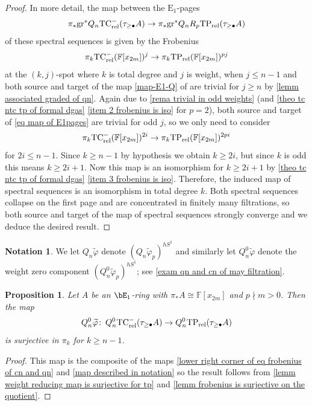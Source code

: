 \documentclass[english,10pt]{amsart}
\newcommand{\rel}{\textup{rel}}
\newcommand{\field}{\mathbb{F}}
\newtheorem{prop}{Proposition}[section]
\theoremstyle{definition}
\newtheorem{nota}{Notation}[section]
\numberwithin{equation}{section}
\newcommand{\rntc}{\mathrm{TC}_{\rel}^{-}}
\newcommand{\rtp}{\mathrm{TP}_{\rel}}
\newcommand{\wtw}{\tau_{\geq \bullet}}
\newcommand{\pis}{\pi_*}
\def\co{\colon\thinspace}
\newcommand{\gr}{\textup{gr}^*}
\begin{document}
\begin{proof}
In more detail, the map between the $\mathrm{E}_1$-pages 
\begin{equation}\label{map-E1-Q} \pi_*\gr Q_n \rntc(\tau_{\geq \bullet }A)\to \pi_*\gr Q_nR_p\rtp(\tau_{\geq \bullet }A)
\end{equation}
of these spectral sequences is given by the Frobenius 
\begin{equation}\label{eq map of E1pages}
\pi_k\rntc(\field[x_{2m}])^{j} \to \pi_k \rtp(\field[x_{2m}])^{pj}
\end{equation}
at the $(k,j)$-spot where $k$ is total degree and $j$ is weight, 
when $j\leq n-1$ and both source and target of the map \eqref{map-E1-Q} of are trivial for $j \geq n$ by \autoref{lemm associated graded of qn}.
Again due to  \autoref{rema trivial in odd weights} (and \autoref{theo tc ntc tp of formal dgas} \eqref{item 2 frobenius is iso} for $p=2$), both source and target of \eqref{eq map of E1pages} are trivial for odd $j$, so we only need to consider 
\[\pi_k\rntc(\field[x_{2m}])^{2i} \to \pi_k \rtp(\field[x_{2m}])^{2pi}\]
for  $2i\leq n-1$.  Since $k\geq n-1$ by hypothesis we obtain $k\geq 2i$, but since $k$ is odd this means $k\geq 2i+1$. Now this map is an isomorphism for $k \geq 2i+1$ by \autoref{theo tc ntc tp of formal dgas} \eqref{item 3 frobenius is iso}. Therefore, the induced map of spectral sequences is an isomorphism in total degree $k$. Both spectral sequences collapse on the first page and are concentrated in finitely many filtrations, so both source and target of the map of spectral sequences strongly converge and we deduce the desired result.

\end{proof}

\begin{nota}
We let $Q_n\widetilde{\varphi}$ denote $(Q_n\widetilde{\varphi}_p)^{hS^1}$ and similarly let  $Q_n^0\widetilde{\varphi}$ denote the weight zero component $(Q_n^0\widetilde{\varphi}_p)^{hS^1}$; see \autoref{exam qn and cn of may filtration}.
\end{nota}
\begin{prop}\label{coro frobenius is surjective in homotopy}
Let $A$ be an $\bE_1$-ring with $\pis A \cong \field[x_{2m}]$ and $p\nmid m>0$. Then the map 
\[Q_n^0\widetilde{\varphi} \co Q_n^0\rntc(\wtw A) \to Q_n^0 \rtp(\wtw A)\]
is surjective in $\pi_k$ for $k \geq n-1$.
\end{prop}
\begin{proof}
This map is the composite of the maps \eqref{lower right corner of eq frobenius of cn and qn} and 
\eqref{map described in notation} so the result follows from 
\autoref{lemm weight reducing map is surjective for tp} and \autoref{lemm frobenius is surjective on the quotient}.
\end{proof}
\end{document}
